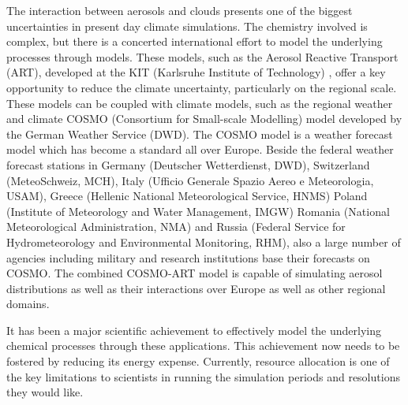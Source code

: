 The  interaction  between aerosols  and  clouds  presents  one of  the
biggest  uncertainties  in   present  day  climate  simulations.   The
chemistry involved is complex,  but there is a concerted international
effort to model the underlying processes through models. These models,
such as  the Aerosol  Reactive Transport (ART),  developed at  the KIT
(Karlsruhe  Institute of  Technology)  , offer  a  key opportunity  to
reduce   the  climate  uncertainty,   particularly  on   the  regional
scale. These  models can be coupled  with climate models,  such as the
regional  weather  and   climate  COSMO  (Consortium  for  Small-scale
Modelling) model  developed by the German Weather  Service (DWD).  The
COSMO model  is a weather forecast  model which has  become a standard
all  over Europe.   Beside the  federal weather  forecast  stations in
Germany  (Deutscher  Wetterdienst,  DWD),  Switzerland  (MeteoSchweiz,
MCH),  Italy (Ufficio  Generale  Spazio Aereo  e Meteorologia,  USAM),
Greece  (Hellenic   National  Meteorological  Service,   HNMS)  Poland
(Institute  of   Meteorology  and  Water   Management,  IMGW)  Romania
(National  Meteorological  Administration,  NMA) and  Russia  (Federal
Service for Hydrometeorology  and Environmental Monitoring, RHM), also
a   large  number   of  agencies   including  military   and  research
institutions  base their  forecasts on  COSMO. The  combined COSMO-ART
model is capable of simulating  aerosol distributions as well as their
interactions over Europe as well as other regional domains.

It has  been a major  scientific achievement to effectively  model the
underlying  chemical  processes   through  these  applications.   This
achievement  now   needs  to  be  fostered  by   reducing  its  energy
expense. Currently, resource allocation  is one of the key limitations
to scientists  in running the simulation periods  and resolutions they
would like.
